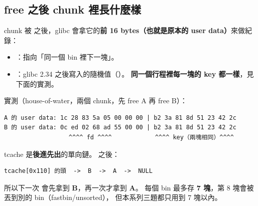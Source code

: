 \subsection{free 之後 chunk 裡長什麼樣}

chunk 被  之後，glibc 會拿它的\textbf{前 16 bytes（也就是原本的 user data）}來做紀錄：

\begin{center}
\end{center}

\begin{itemize}[leftmargin=1.4em,itemsep=1pt]
  \item {}：指向「同一個 bin 裡下一塊」。
  \item {}：glibc 2.34 之後寫入的隨機值（）。
        \textbf{同一個行程裡每一塊的 key 都一樣}，見下面的實測。
\end{itemize}

實測（house-of-water，兩個  chunk，先 free A 再 free B）：

\begin{lstlisting}[style=raw]
A 的 user data: 1c 28 83 5a 05 00 00 00 | b2 3a 81 8d 51 23 42 2c
B 的 user data: 0c ed 02 68 ad 55 00 00 | b2 3a 81 8d 51 23 42 2c
                  ^^^^ fd ^^^^            ^^^^ key（兩塊相同）^^^^
\end{lstlisting}

\begin{keybox}
tcache 是\textbf{後進先出}的單向鏈。 之後：

\begin{lstlisting}[style=raw]
tcache[0x110] 的頭  ->  B  ->  A  ->  NULL
\end{lstlisting}

所以下一次  會先拿到 \textbf{B}，再一次才拿到 \textbf{A}。
每個 bin 最多存 \textbf{7 塊}，第 8 塊會被丟到別的 bin（fastbin/unsorted），
但本系列三題都只用到 7 塊以內。
\end{keybox}

